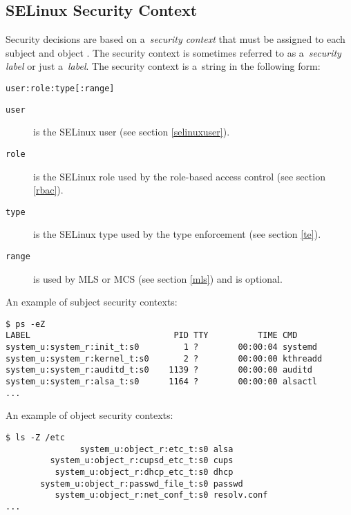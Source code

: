 \subsection{SELinux Security Context}
\label{context}
Security decisions are based on a~\emph{security context} that must be assigned
to each subject and object \cite[pp.~27--28]{tsn}. The security context is
sometimes referred to as a~\emph{security label} or just a~\emph{label}. The
security context is a~string in the following form:
\begin{lstlisting}
user:role:type[:range]
\end{lstlisting}
\begin{description}
    \item [\texttt{user}] is the SELinux user (see section \ref{selinuxuser}).
    \item [\texttt{role}] is the SELinux role used by the role-based access
        control (see section \ref{rbac}).
    \item [\texttt{type}] is the SELinux type used by the type enforcement (see
        section \ref{te}).
    \item [\texttt{range}] is used by MLS or MCS (see section \ref{mls}) and is
        optional.
\end{description}

An example of subject security contexts:
\begin{lstlisting}
$ ps -eZ
LABEL                             PID TTY          TIME CMD
system_u:system_r:init_t:s0         1 ?        00:00:04 systemd
system_u:system_r:kernel_t:s0       2 ?        00:00:00 kthreadd
system_u:system_r:auditd_t:s0    1139 ?        00:00:00 auditd
system_u:system_r:alsa_t:s0      1164 ?        00:00:00 alsactl
...
\end{lstlisting}

An example of object security contexts:
\begin{lstlisting}
$ ls -Z /etc
               system_u:object_r:etc_t:s0 alsa
         system_u:object_r:cupsd_etc_t:s0 cups
          system_u:object_r:dhcp_etc_t:s0 dhcp
       system_u:object_r:passwd_file_t:s0 passwd
          system_u:object_r:net_conf_t:s0 resolv.conf
...
\end{lstlisting}

